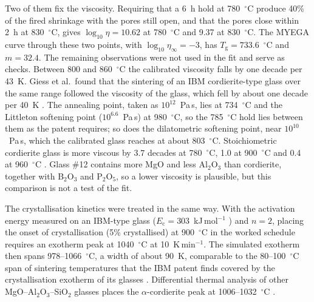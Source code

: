 Two of them fix the viscosity. Requiring that a 6~h hold at 780~$^\circ$C produce 40\% of the fired shrinkage with the pores still open, and that the pores close within 2~h at 830~$^\circ$C, gives $\log_{10}\eta = 10.62$ at 780~$^\circ$C and 9.37 at 830~$^\circ$C. The MYEGA curve through these two points, with $\log_{10}\eta_\infty = -3$, has $T_{\mathrm{g}} = 733.6$~$^\circ$C and $m = 32.4$. The remaining observations were not used in the fit and serve as checks. Between 800 and 860~$^\circ$C the calibrated viscosity falls by one decade per 43~K. Giess et al.\ found that the sintering of an IBM cordierite-type glass over the same range followed the viscosity of the glass, which fell by about one decade per 40~K \cite{giess1984isothermal}. The annealing point, taken as $10^{12}$~Pa\,s, lies at 734~$^\circ$C and the Littleton softening point ($10^{6.6}$~Pa\,s) at 980~$^\circ$C, so the 785~$^\circ$C hold lies between them as the patent requires; so does the dilatometric softening point, near $10^{10}$~Pa\,s, which the calibrated glass reaches at about 803~$^\circ$C. Stoichiometric cordierite glass is more viscous by 3.7 decades at 780~$^\circ$C, 1.0 at 900~$^\circ$C and 0.4 at 960~$^\circ$C \cite{reinsch2008crystal}. Glass \#12 contains more MgO and less Al$_2$O$_3$ than cordierite, together with B$_2$O$_3$ and P$_2$O$_5$, so a lower viscosity is plausible, but this comparison is not a test of the fit.

The crystallisation kinetics were treated in the same way. With the activation energy measured on an IBM-type glass ($E_{\mathrm{c}} = 303$~kJ\,mol$^{-1}$ \cite{watanabe1994crystallization}) and $n = 2$, placing the onset of crystallisation (5\% crystallised) at 900~$^\circ$C in the worked schedule requires an exotherm peak at 1040~$^\circ$C at 10~K\,min$^{-1}$. The simulated exotherm then spans 978--1066~$^\circ$C, a width of about 90~K, comparable to the 80--100~$^\circ$C span of sintering temperatures that the IBM patent finds covered by the crystallisation exotherm of its glasses \cite{kumar1981glassceramic}. Differential thermal analysis of other MgO--Al$_2$O$_3$--SiO$_2$ glasses places the $\alpha$-cordierite peak at 1006--1032~$^\circ$C \cite{yu2022synthesis,wang2026effect}.

